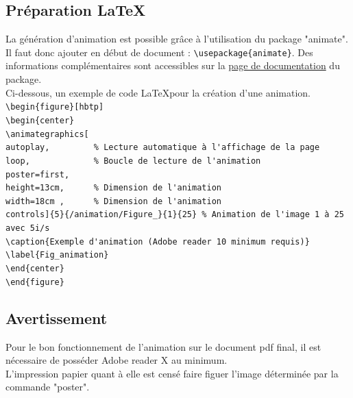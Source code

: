 \documentclass[a4paper,12pt]{report}
\begin{document}
\subsection{Préparation \LaTeX}
La génération d'animation est possible grâce à l'utilisation du package "animate". Il faut donc ajouter en début de document : \verb|\usepackage{animate}|. Des informations complémentaires sont accessibles sur la \href{http://tug.ctan.org/macros/latex/contrib/animate/animate.pdf}{page de documentation} du package.\\

Ci-dessous, un exemple de code \LaTeX pour la création d'une animation. \\


\verb|\begin{figure}[hbtp]|  \\
\verb|\begin{center}|  \\
\verb|\animategraphics[|  \\
\verb|autoplay, 		% Lecture automatique à l'affichage de la page |  	\\
\verb|loop,				% Boucle de lecture de l'animation |  		\\
\verb|poster=first, |  \\
\verb|height=13cm, 		% Dimension de l'animation |  \\
\verb|width=18cm ,		% Dimension de l'animation |  \\
\verb|controls]{5}{/animation/Figure_}{1}{25} % Animation de l'image 1 à 25 avec 5i/s |  \\
\verb|\caption{Exemple d'animation (Adobe reader 10 minimum requis)} |  \\
\verb|\label{Fig_animation} |  \\
\verb|\end{center} |   \\
\verb|\end{figure}|  \\


\subsection{Avertissement}
Pour le bon fonctionnement de l'animation sur le document pdf final, il est nécessaire de posséder Adobe reader X au minimum. \\

L'impression papier quant à elle est censé faire figuer l'image déterminée par la commande "poster".
\end{document}
